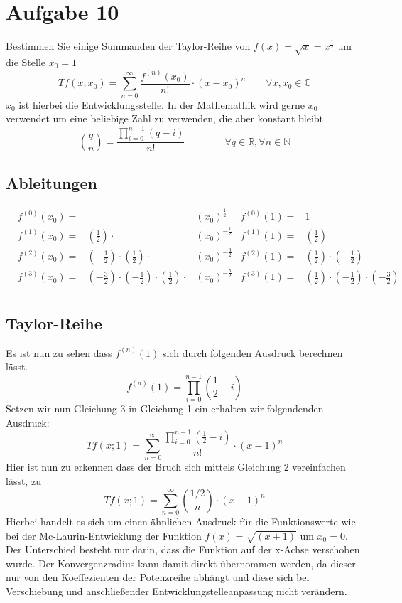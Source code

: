 \documentclass[18pt,a4paper]{article}
\begin{document}
\section*{Aufgabe 10}
Bestimmen Sie einige Summanden der Taylor-Reihe von $f(x)=\sqrt{x} = x^{\frac{1}{2}}$ um die Stelle $x_0 = 1$
\begin{equation}
Tf(x;x_0)= \sum_{n=0}^{\infty}\frac{f^{(n)}(x_0)}{n!} \cdot (x-x_0)^n \qquad\forall x,x_0 \in \mathbb{C}
\end{equation}
$x_0$ ist hierbei die Entwicklungsstelle. In der Mathemathik wird gerne $x_0$ verwendet um eine beliebige Zahl zu verwenden, die aber konstant bleibt
\begin{equation}
\binom{q}{n} = \frac{\prod_{i=0}^{n-1}(q-i)}{n!} \qquad \qquad \forall q \in \mathbb{R},\forall n \in \mathbb{N}
\end{equation}
\subsection*{Ableitungen}
\begin{align*}
&f^{(0)}(x_0) =& &(x_0)^{\frac{1}{2}}
&f^{(0)}(1) =& 1\\
&f^{(1)}(x_0) =& (\frac{1}{2})\cdot&(x_0)^{-\frac{1}{2}}
&f^{(1)}(1) =& (\frac{1}{2})\\
&f^{(2)}(x_0) =& (-\frac{1}{2})\cdot(\frac{1}{2})\cdot&(x_0)^{-\frac{3}{2}}
&f^{(2)}(1) =& (\frac{1}{2})\cdot(-\frac{1}{2})\\
&f^{(3)}(x_0) =& (-\frac{3}{2})\cdot(-\frac{1}{2})\cdot(\frac{1}{2})\cdot&(x_0)^{-\frac{5}{2}}
&f^{(3)}(1) =& (\frac{1}{2})\cdot(-\frac{1}{2})\cdot(-\frac{3}{2})\\
\end{align*}
\subsection*{Taylor-Reihe}
Es ist nun zu sehen dass  $f^{(n)}(1)$ sich durch folgenden Ausdruck berechnen lässt.
\begin{equation}
f^{(n)}(1) = \prod_{i=0}^{n-1}\left(\frac{1}{2}-i\right)
\end{equation}
Setzen wir nun Gleichung 3 in Gleichung 1 ein erhalten wir folgendenden Ausdruck:
\begin{equation}
Tf(x;1)= \sum_{n=0}^{\infty}\frac{\prod_{i=0}^{n-1}\left(\frac{1}{2}-i\right)}{n!} \cdot (x-1)^n
\end{equation}
Hier ist nun zu erkennen dass der Bruch sich mittels Gleichung 2 vereinfachen lässt, zu
\begin{equation*}
Tf(x;1)= \sum_{n=0}^{\infty}\binom{1/2}{n} \cdot (x-1)^n
\end{equation*}
Hierbei handelt es sich um einen ähnlichen Ausdruck für die Funktionswerte wie bei der Mc-Laurin-Entwicklung der Funktion $f(x)= \sqrt{(x+1)}$ um $x_0 = 0$. Der Unterschied besteht nur darin, dass die Funktion auf der x-Achse verschoben wurde. Der Konvergenzradius kann damit direkt übernommen werden, da dieser nur von den Koeffezienten der Potenzreihe abhängt und diese sich bei Verschiebung und anschließender Entwicklungstelleanpassung nicht verändern.
\end{document}
